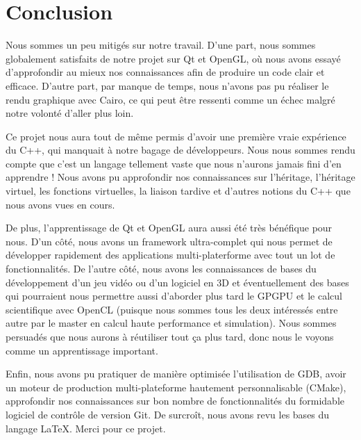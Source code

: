 \documentclass[11pt]{article}
\begin{document}
\section{Conclusion}

Nous sommes un peu mitigés sur notre travail. D'une part, nous sommes
globalement satisfaits de notre projet sur Qt et OpenGL, où nous avons essayé
d'approfondir au mieux nos connaissances afin de produire un code clair et
efficace. D'autre part, par manque de temps, nous n'avons pas pu réaliser le
rendu graphique avec Cairo, ce qui peut être ressenti comme un échec malgré
notre volonté d'aller plus loin.

Ce projet nous aura tout de même permis d'avoir une première vraie expérience du
C++, qui manquait à notre bagage de développeurs. Nous nous sommes rendu compte
que c'est un langage tellement vaste que nous n'aurons jamais fini d'en
apprendre ! Nous avons pu approfondir nos connaissances sur l'héritage,
l'héritage virtuel, les fonctions virtuelles, la liaison tardive et d'autres
notions du C++ que nous avons vues en cours.

De plus, l'apprentissage de Qt et OpenGL aura aussi été très bénéfique pour
nous. D'un côté, nous avons un framework ultra-complet qui nous permet de
développer rapidement des applications multi-platerforme avec tout un lot de
fonctionnalités. De l'autre côté, nous avons les connaissances de bases du
développement d'un jeu vidéo ou d'un logiciel en 3D et éventuellement des bases
qui pourraient nous permettre aussi d'aborder plus tard le GPGPU et le calcul
scientifique avec OpenCL (puisque nous sommes tous les deux intéressés entre
autre par le master en calcul haute performance et simulation). Nous sommes
persuadés que nous aurons à réutiliser tout ça plus tard, donc nous le voyons
comme un apprentissage important. 

Enfin, nous avons pu pratiquer de manière optimisée l'utilisation de GDB, avoir
un moteur de production multi-plateforme hautement personnalisable (CMake),
approfondir nos connaissances sur bon nombre de fonctionnalités du formidable
logiciel de contrôle de version Git. De surcroît, nous avons revu les bases du
langage LaTeX. Merci pour ce projet.
\end{document}
